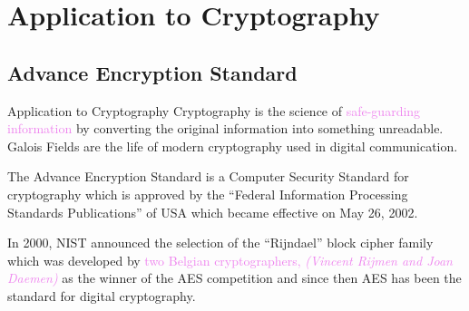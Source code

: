 \documentclass{beamer}
\begin{document}
\section{Application to Cryptography}
\subsection{Advance Encryption Standard}
\begin{frame}{Application to Cryptography}
  Cryptography is the science of \textcolor{violet}{safe-guarding information} by converting the original information into something unreadable. Galois Fields are the life of modern cryptography used in digital communication.
  \vspace{3mm}

  \begin{tcolorbox}[colback=white, colframe=brown!80!black, boxsep=1mm, title={Advance Encryption Standard(AES)}]
    The Advance Encryption Standard is a Computer Security Standard for cryptography which is approved by the ``Federal Information Processing Standards Publications'' of USA which became effective on May 26, 2002.
  \end{tcolorbox}

\vspace{3mm}
In 2000, NIST announced the selection of the ``Rijndael'' block cipher family which was developed by \textcolor{violet}{two Belgian cryptographers, \textit{(Vincent Rijmen and Joan Daemen)}} as the winner of the AES competition and since then AES has been the standard for digital cryptography.
\end{frame}
\end{document}
